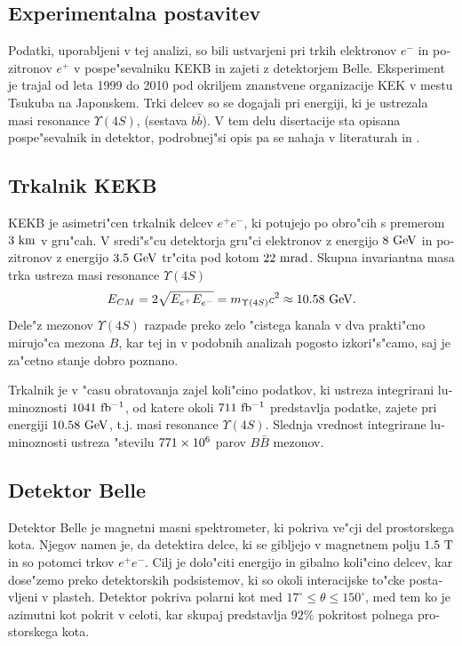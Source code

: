 \begin{otherlanguage}{slovene}
\section{Experimentalna postavitev}

Podatki, uporabljeni v tej analizi, so bili ustvarjeni pri trkih elektronov $e^-$ in pozitronov $e^+$ v pospe"sevalniku KEKB in zajeti z detektorjem Belle. Eksperiment je trajal od leta 1999 do 2010 pod okriljem znanstvene organizacije KEK v mestu Tsukuba na Japonskem. Trki delcev so se dogajali pri energiji, ki je ustrezala masi resonance $\Upsilon(4S)$, (sestava $b \bar b$). V tem delu disertacije sta opisana pospe"sevalnik in detektor, podrobnej"si opis pa se nahaja v literaturah \cite{doi:10.1093/ptep/pts102} in \cite{ABASHIAN2002117}.

\subsection{Trkalnik KEKB}

KEKB je asimetri"cen trkalnik delcev $e^+e^-$, ki potujejo po obro"cih s premerom $3\mathrm{~km}$ v gru"cah. V sredi"s"cu detektorja gru"ci elektronov z energijo $8\mathrm{~GeV}$ in pozitronov z energijo $3.5\mathrm{~GeV}$ tr"cita pod kotom $22\mathrm{~mrad}$. Skupna invariantna masa trka ustreza masi resonance $\Upsilon(4S)$ 
\begin{equation}
E_{CM} = 2\sqrt{E_{e^+}E_{e^-}} = m_{\Upsilon(4S)}c^2 \approx 10.58\mathrm{~GeV}.
\end{equation}
Dele"z mezonov $\Upsilon(4S)$ razpade preko zelo "cistega kanala v dva prakti"cno mirujo"ca mezona $B$, kar tej in v podobnih analizah pogosto izkori"s"camo, saj je za"cetno stanje dobro poznano.

Trkalnik je v "casu obratovanja zajel koli"cino podatkov, ki ustreza integrirani luminoznosti $1041\mathrm{~fb^{-1}}$, od katere okoli $711\mathrm{~fb^{-1}}$ predstavlja podatke, zajete pri energiji $10.58\mathrm{~GeV}$, t.j. masi resonance $\Upsilon(4S)$. Slednja vrednost integrirane luminoznosti ustreza "stevilu $771\times 10^{6}$ parov $B \bar B$ mezonov.

\subsection{Detektor Belle}
Detektor Belle je magnetni masni spektrometer, ki pokriva ve"cji del prostorskega kota. Njegov namen je, da detektira delce, ki se gibljejo v magnetnem polju $1.5\mathrm{~T}$ in so potomci trkov $e^+e^-$. Cilj je dolo"citi energijo in gibalno koli"cino delcev, kar dose"zemo preko detektorskih podsistemov, ki so okoli interacijske to"cke postavljeni v plasteh. Detektor pokriva polarni kot med $17^\circ \leq \theta \leq 150^\circ$, med tem ko je azimutni kot pokrit v celoti, kar skupaj predstavlja $92\%$ pokritost polnega prostorskega kota.

\end{otherlanguage}
